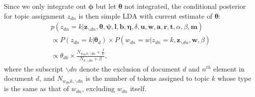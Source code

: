 \documentclass{article}
\begin{document}
Since we only integrate out $\boldsymbol{\phi}$ but let $\boldsymbol{\theta}$ not integrated, the conditional posterior for topic assignment $z_{dn}$ is then simple LDA with current estimate of $\boldsymbol{\theta}$:
\begin{equation}
\begin{aligned}
&p(z_{dn}=k| \boldsymbol{z}_{\backslash dn}, \boldsymbol{\theta}, \boldsymbol{\psi}, \boldsymbol{l}, \boldsymbol{b},\boldsymbol{\eta}, \delta, \boldsymbol{u}, \boldsymbol{w}, \boldsymbol{a}, \boldsymbol{r}, \boldsymbol{t}, \alpha, \beta, \boldsymbol{m})\\&\propto P(z_{dn}=k|\boldsymbol{\theta}_d)\times P(w_{dn}=w|z_{dn}=k, \boldsymbol{z}_{\backslash dn}, \boldsymbol{w}, \beta)
\\&\propto 
\theta_{dk} \times 	  \frac{N_{w_{dn}k, \backslash dn}+\frac{\beta}{V}}{N_{k, \backslash dn}+\beta},
\end{aligned}
\end{equation}
where the subscript $\backslash dn$ denote the exclusion of document $d$ and $n^{th}$ element in document $d$, and $N_{w_{dn}k, \backslash dn}$ is the number of tokens assigned to topic $k$ whose type is the same as that of $w_{dn}$, excluding $w_{dn}$ itself. 
\end{document}
